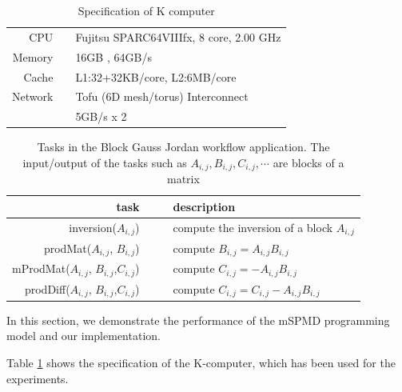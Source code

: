 \documentclass[graybox]{svmult}
\begin{document}
\begin{table}[t]
\begin{center}
 \caption{Specification of K computer}
 \label{table:k-spec}
\begin{tabular}[t]{rrl}\hline\hline
 CPU & &Fujitsu SPARC64VIIIfx, 8 core, 2.00 GHz\\
Memory && 16GB , 64GB/s \\
Cache  && L1:32+32KB/core,  L2:6MB/core \\
Network & & Tofu (6D mesh/torus) Interconnect \\
        & & 5GB/s x 2 \\\hline
\end{tabular}
\end{center}
\end{table}

\begin{table}[t]
\begin{center}
\caption{Tasks in the Block Gauss Jordan workflow application. The input/output of the tasks such as $A_{i,j}, B_{i,j}, C_{i,j}, \cdots $ are blocks of a matrix }
\label{table:tasks}
\begin{tabular}[t]{rrl}\hline\hline
task&  & description \\\hline
inversion($A_{i,j}$) & ~~&compute the inversion of a block $A_{i,j}$ \\
prodMat($A_{i,j}$, $B_{i,j}$)& & compute $B_{i,j} =A_{i,j} B_{i,j}$ \\
mProdMat($A_{i,j}$, $B_{i,j}$,$C_{i,j}$) & &compute $C_{i,j} = - A_{i,j} B_{i,j}$\\
prodDiff($A_{i,j}$, $B_{i,j}$,$C_{i,j}$)  & &compute $C_{i,j} = C_{i,j}- A_{i,j} B_{i,j}$\\\hline
\end{tabular}

\end{center}\end{table}

In this section, we demonstrate the performance of the mSPMD programming model and our implementation. 

Table \ref{table:k-spec} shows the specification of the K-computer, which has been used for the experiments.
\end{document}
